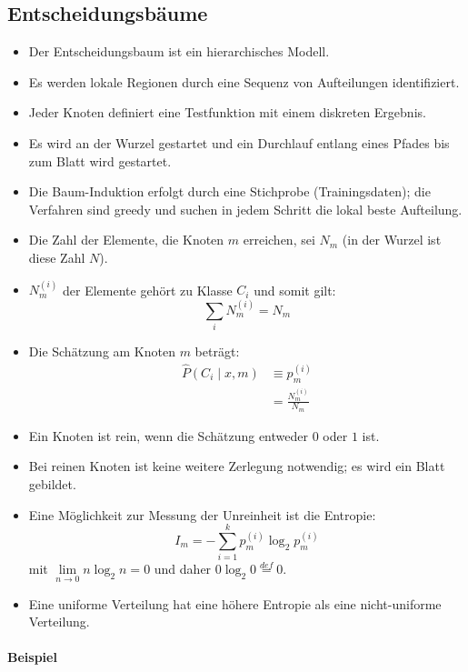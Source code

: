\documentclass{scrartcl}
\begin{document}
\subsection{Entscheidungsbäume}

\begin{itemize}
	\item Der Entscheidungsbaum ist ein hierarchisches Modell.
	\item Es werden lokale Regionen durch eine Sequenz von Aufteilungen 
	identifiziert.
	\item Jeder Knoten definiert eine Testfunktion mit einem diskreten Ergebnis.
	\item Es wird an der Wurzel gestartet und ein Durchlauf entlang eines 
	Pfades bis zum Blatt wird gestartet.
	\item Die Baum-Induktion erfolgt durch eine Stichprobe (Trainingsdaten); 
	die Verfahren sind greedy und suchen in jedem Schritt die lokal beste 
	Aufteilung.
	\item Die Zahl der Elemente, die Knoten $ m $ erreichen, sei $ N_m $ (in 
	der Wurzel ist diese Zahl $ N $).
	\item $ N_m^{(i)} $ der Elemente gehört zu Klasse $ C_i $ und somit gilt:
	\[ \sum_i N_m^{(i)} = N_m \]
	\item Die Schätzung am Knoten $ m $ beträgt:
	\begin{align*}
		\hat{P}(C_i \mid x,m) &\equiv p_m^{(i)} \\
		&= \frac{N_m^(i)}{N_m}
	\end{align*}
	\item Ein Knoten ist rein, wenn die Schätzung entweder $ 0 $ oder $ 1 $ ist.
	\item Bei reinen Knoten ist keine weitere Zerlegung notwendig; es wird ein 
	Blatt gebildet.
	\item Eine Möglichkeit zur Messung der Unreinheit ist die Entropie:
	\[ I_m = -\sum_{i=1}^{k} p_m^{(i)} \log_2 p_m^{(i)} \]
	mit $ \lim\limits_{n \rightarrow 0} n \log_2 n = 0 $ und daher $ 0 \log_2 0 
	\stackrel{def}{=} 0 $.
	\item Eine uniforme Verteilung hat eine höhere Entropie als eine 
	nicht-uniforme Verteilung.
\end{itemize}

\paragraph{Beispiel}
\end{document}
